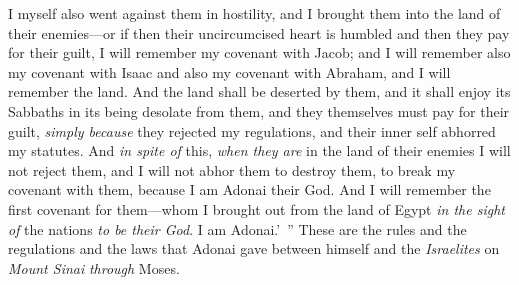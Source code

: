\begin{biblechapter}
\verse I myself also went against them in hostility, and I brought them into the land of their enemies—or if then their uncircumcised heart is humbled and then they pay for their guilt,
\verse I will remember my covenant with Jacob; and I will remember also my covenant with Isaac and also my covenant with Abraham, and I will remember the land.
\verse And the land shall be deserted by them, and it shall enjoy its Sabbaths in its being desolate from them, and they themselves must pay for their guilt, \textit{simply because} they rejected my regulations, and their inner self abhorred my statutes.
\verse And \textit{in spite of} this, \textit{when they are} in the land of their enemies I will not reject them, and I will not abhor them to destroy them, to break my covenant with them, because I am Adonai their God.
\verse And I will remember the first covenant for them—whom I brought out from the land of Egypt \textit{in the sight of} the nations \textit{to be their God}. I am Adonai.’ ”
\verse These are the rules and the regulations and the laws that Adonai gave between himself and the \textit{Israelites} on \textit{Mount Sinai} \textit{through} Moses.
\end{biblechapter}


